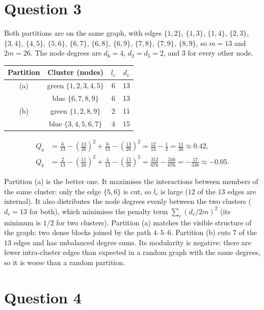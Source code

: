 \documentclass[a4paper]{article}
\begin{document}
\section{Question 3}

Both partitions are on the same graph, with edges $\{1,2\}$, $\{1,3\}$, $\{1,4\}$, $\{2,3\}$, $\{3,4\}$, $\{4,5\}$, $\{5,6\}$, $\{6,7\}$, $\{6,8\}$, $\{6,9\}$, $\{7,8\}$, $\{7,9\}$, $\{8,9\}$, so $m=13$ and $2m=26$. The node degrees are $d_6=4$, $d_2=d_5=2$, and $3$ for every other node.

\begin{center}
\begin{tabular}{c|c|c|c}
    Partition & Cluster (nodes) & $l_c$ & $d_c$ \\
    \hline
    (a) & green $\{1,2,3,4,5\}$ & 6 & 13 \\
        & blue $\{6,7,8,9\}$ & 6 & 13 \\
    \hline
    (b) & green $\{1,2,8,9\}$ & 2 & 11 \\
        & blue $\{3,4,5,6,7\}$ & 4 & 15 \\
\end{tabular}
\end{center}

\begin{align}
    Q_a &= \frac{6}{13} - \left(\frac{13}{26}\right)^2 + \frac{6}{13} - \left(\frac{13}{26}\right)^2 = \frac{12}{13} - \frac{1}{2} = \frac{11}{26} \approx 0.42, \\
    Q_b &= \frac{2}{13} - \left(\frac{11}{26}\right)^2 + \frac{4}{13} - \left(\frac{15}{26}\right)^2 = \frac{312}{676} - \frac{346}{676} = -\frac{17}{338} \approx -0.05.
\end{align}

Partition (a) is the better one. It maximises the interactions between members of the same cluster: only the edge $\{5,6\}$ is cut, so $l_c$ is large ($12$ of the $13$ edges are internal). It also distributes the node degrees evenly between the two clusters ($d_c=13$ for both), which minimises the penalty term $\sum_c (d_c/2m)^2$ (its minimum is $1/2$ for two clusters). Partition (a) matches the visible structure of the graph: two dense blocks joined by the path $4$--$5$--$6$. Partition (b) cuts $7$ of the $13$ edges and has unbalanced degree sums. Its modularity is negative: there are fewer intra-cluster edges than expected in a random graph with the same degrees, so it is worse than a random partition.

\section{Question 4}
\end{document}
